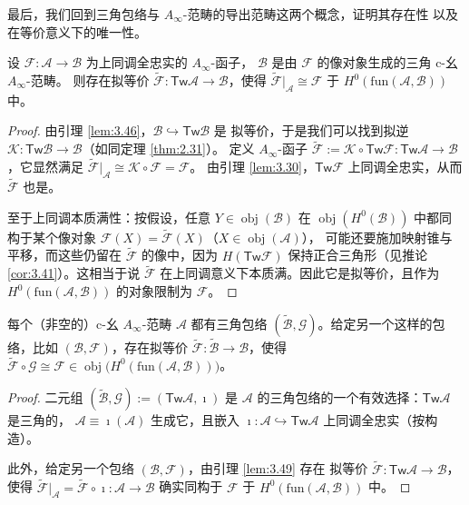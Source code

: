 最后，我们回到三角包络与 $A_\infty$-范畴的导出范畴这两个概念，证明其存在性
以及在等价意义下的唯一性。

\begin{Lem}\label{lem:3.49}
设 $\mathcal F:\mathcal A\to\mathcal B$ 为上同调全忠实的 $A_\infty$-函子，
$\mathcal B$ 是由 $\mathcal F$ 的像对象生成的三角 c-幺 $A_\infty$-范畴。
则存在拟等价 $\tilde{\mathcal F}:\mathsf{Tw}\mathcal A\to\mathcal B$，使得
$\tilde{\mathcal F}|_{\mathcal A}\cong\mathcal F$ 于
$H^0(\mathrm{fun}(\mathcal A,\mathcal B))$ 中。
\end{Lem}

\begin{proof}
由引理 \ref{lem:3.46}，$\mathcal B\hookrightarrow\mathsf{Tw}\mathcal B$ 是
拟等价，于是我们可以找到拟逆
$\mathcal K:\mathsf{Tw}\mathcal B\to\mathcal B$（如同定理 \ref{thm:2.31}）。
定义 $A_\infty$-函子
$\tilde{\mathcal F}:=\mathcal K\circ\mathsf{Tw}\mathcal F:
\mathsf{Tw}\mathcal A\to\mathcal B$，它显然满足
$\tilde{\mathcal F}|_{\mathcal A}\cong\mathcal K\circ\mathcal F=\mathcal F$。
由引理 \ref{lem:3.30}，$\mathsf{Tw}\mathcal F$ 上同调全忠实，从而
$\tilde{\mathcal F}$ 也是。

至于上同调本质满性：按假设，任意 $Y\in\operatorname{obj}(\mathcal B)$ 在
$\operatorname{obj}(H^0(\mathcal B))$ 中都同构于某个像对象
$\mathcal F(X)=\tilde{\mathcal F}(X)$（$X\in\operatorname{obj}(\mathcal A)$），
可能还要施加映射锥与平移，而这些仍留在 $\tilde{\mathcal F}$ 的像中，因为
$H(\mathsf{Tw}\mathcal F)$ 保持正合三角形（见推论 \ref{cor:3.41}）。这相当于说
$\tilde{\mathcal F}$ 在上同调意义下本质满。因此它是拟等价，且作为
$H^0(\mathrm{fun}(\mathcal A,\mathcal B))$ 的对象限制为 $\mathcal F$。
\end{proof}

\begin{Pro}\label{pro:3.50}
每个（非空的）c-幺 $A_\infty$-范畴 $\mathcal A$ 都有三角包络
$(\tilde{\mathcal B},\mathcal G)$。给定另一个这样的包络，比如
$(\mathcal B,\mathcal F)$，存在拟等价
$\tilde{\mathcal F}:\tilde{\mathcal B}\to\mathcal B$，使得
$\tilde{\mathcal F}\circ\mathcal G\cong\mathcal F\in\operatorname{obj}
\bigl(H^0(\mathrm{fun}(\mathcal A,\mathcal B))\bigr)$。
\end{Pro}

\begin{proof}
二元组 $(\tilde{\mathcal B},\mathcal G):=(\mathsf{Tw}\mathcal A,\imath)$ 是
$\mathcal A$ 的三角包络的一个有效选择：$\mathsf{Tw}\mathcal A$ 是三角的，
$\mathcal A\equiv\imath(\mathcal A)$ 生成它，且嵌入
$\imath:\mathcal A\hookrightarrow\mathsf{Tw}\mathcal A$ 上同调全忠实（按构造）。

此外，给定另一个包络 $(\mathcal B,\mathcal F)$，由引理 \ref{lem:3.49} 存在
拟等价 $\tilde{\mathcal F}:\mathsf{Tw}\mathcal A\to\mathcal B$，使得
$\tilde{\mathcal F}|_{\mathcal A}=\tilde{\mathcal F}\circ\imath:
\mathcal A\to\mathcal B$ 确实同构于 $\mathcal F$ 于
$H^0(\mathrm{fun}(\mathcal A,\mathcal B))$ 中。
\end{proof}

